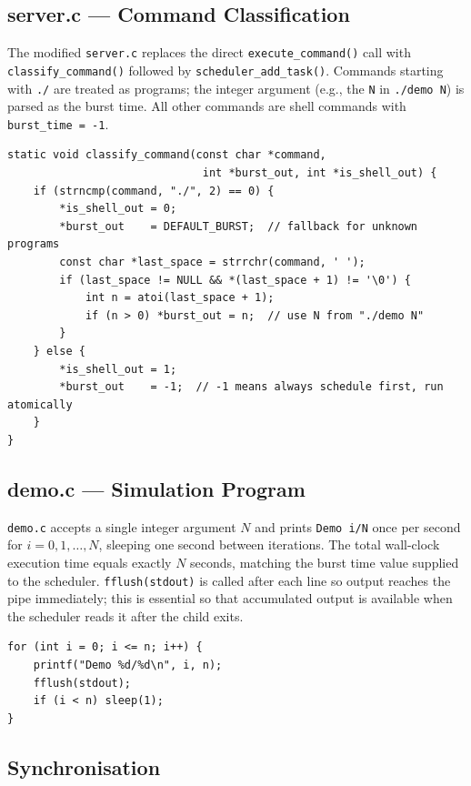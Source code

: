 \documentclass[12pt]{article}
\begin{document}
\subsection{server.c --- Command Classification}

The modified \texttt{server.c} replaces the direct \texttt{execute\_command()} call with
\texttt{classify\_command()} followed by \texttt{scheduler\_add\_task()}. Commands
starting with \texttt{./} are treated as programs; the integer argument (e.g., the
\texttt{N} in \texttt{./demo N}) is parsed as the burst time. All other commands are
shell commands with \texttt{burst\_time = -1}.

\begin{lstlisting}[caption={Command classification in server.c}]
static void classify_command(const char *command,
                              int *burst_out, int *is_shell_out) {
    if (strncmp(command, "./", 2) == 0) {
        *is_shell_out = 0;
        *burst_out    = DEFAULT_BURST;  // fallback for unknown programs
        const char *last_space = strrchr(command, ' ');
        if (last_space != NULL && *(last_space + 1) != '\0') {
            int n = atoi(last_space + 1);
            if (n > 0) *burst_out = n;  // use N from "./demo N"
        }
    } else {
        *is_shell_out = 1;
        *burst_out    = -1;  // -1 means always schedule first, run atomically
    }
}
\end{lstlisting}

\subsection{demo.c --- Simulation Program}

\texttt{demo.c} accepts a single integer argument $N$ and prints \texttt{Demo i/N} once
per second for $i = 0, 1, \ldots, N$, sleeping one second between iterations. The total
wall-clock execution time equals exactly $N$ seconds, matching the burst time value
supplied to the scheduler. \texttt{fflush(stdout)} is called after each line so output
reaches the pipe immediately; this is essential so that accumulated output is available
when the scheduler reads it after the child exits.

\begin{lstlisting}[caption={Core loop in demo.c}]
for (int i = 0; i <= n; i++) {
    printf("Demo %d/%d\n", i, n);
    fflush(stdout);
    if (i < n) sleep(1);
}
\end{lstlisting}

\subsection{Synchronisation}
\end{document}
